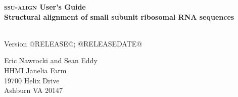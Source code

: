 \begin{titlepage}
{\Large

\vspace*{\fill}


\begin{center}
{\Huge \textbf{\textsc{ssu-align} \huge{User's Guide}}}\\
{\large \textbf{Structural alignment of small subunit ribosomal RNA
    sequences}}\\
\end{center}

\vspace*{\fill}

\begin{center}
\textsl{}\\
Version @RELEASE@; @RELEASEDATE@ \\ 

\vspace*{\fill}

Eric Nawrocki and Sean Eddy\\
HHMI Janelia Farm\\
19700 Helix Drive\\
Ashburn VA 20147\\
\textsl{} \\
\end{center}

\vspace*{\fill}

}
\end{titlepage}
